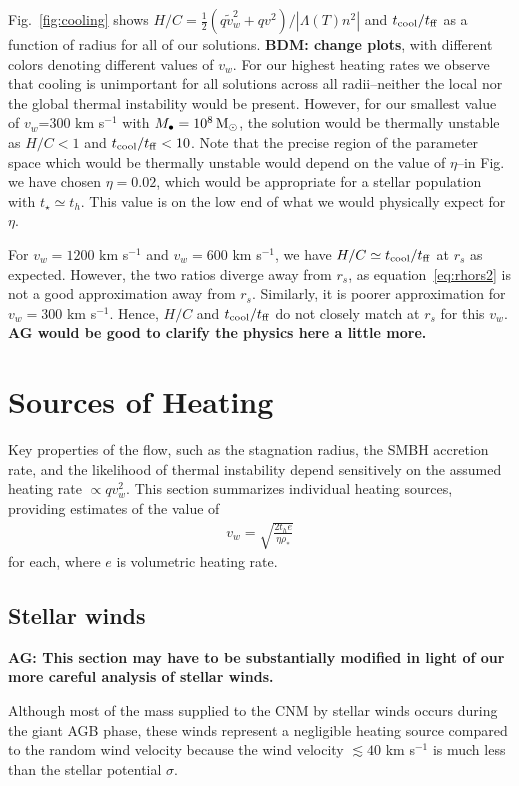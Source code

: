 \documentclass[usenatbib,fleqn]{mn2e}
\newcommand{\rs}{r_s}
\newcommand{\vw}{\tilde{v}_{w}}
\newcommand{\rhostar}{\rho_*}
\newcommand{\Mbh}[1][]{M_{\bullet#1}}
\newcommand{\vwO}{v_{w}}
\newcommand{\tage}{t_{\star}}
\renewcommand{\th}{t_h}
\newcommand{\tcool}{t_{\rm cool}}
\newcommand{\tff}{t_{\rm ff}}
\begin{document}
Fig.~\ref{fig:cooling} shows $H/C=\frac{1}{2} (q \vw^2+q
v^2)/\left|\Lambda(T) n^2\right|$ and $\tcool/\tff$
as a function of radius for all of our solutions. {\bf BDM: change
  plots}, with different colors denoting different values of $\vwO$.
For our highest heating rates we observe that cooling is unimportant
for all solutions across all radii--neither the local nor the global
thermal instability would be present. However,  for our smallest value
of $\vwO$=300 km s$^{-1}$ with $\Mbh=10^8 \Msun$, the solution would be
thermally unstable as $H/C<1$ and $\tcool/\tff<10$. Note that the
precise region of the parameter space which would be thermally
unstable would depend on the value of $\eta$--in
Fig.~\pageref{fig:cooling} we have chosen $\eta=0.02$, which would be
appropriate for a stellar population with $\tage\simeq \th$. This
value is on the low end of what we would physically expect for
$\eta$. 

For $\vwO=1200$ km s$^{-1}$ and $\vwO=600$ km s$^{-1}$, we have
$H/C\simeq\tcool/\tff$ at $\rs$ as expected. However, the two ratios
diverge away from $\rs$, as equation~\eqref{eq:rhors2} is not a good
approximation away from $\rs$. Similarly, it is poorer approximation
for $\vwO=300$ km s$^{-1}$. Hence, $H/C$ and $\tcool/\tff$ do not
closely match at $\rs$ for this $\vwO$. {\bf AG would be good to
  clarify the physics here a little more.}

\section{Sources of Heating}
\label{sec:heating}

Key properties of the flow, such as the stagnation radius, the SMBH accretion rate, and the likelihood of thermal instability depend sensitively on the assumed heating rate $\propto qv_{w}^{2}$.  This section summarizes individual heating sources, providing estimates of the value of
\begin{align}
  v_{w} = \sqrt{\frac{2 t_h e}{\eta \rhostar}}
  \label{eq:vw_eff}
\end{align}
for each, where $e$ is volumetric heating rate.  

\subsection{Stellar winds} 
{\bf AG: This section may have to be substantially modified in light
  of our more careful analysis of stellar winds.}

Although most of the mass supplied to the CNM by stellar winds occurs
during the giant AGB phase, these winds represent a negligible heating
source compared to the random wind velocity because the wind velocity
$\lesssim 40$ km s$^{-1}$ is much less than the stellar potential
$\sigma$.
\end{document}
